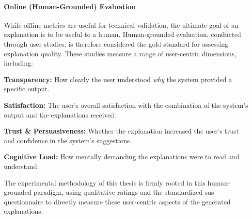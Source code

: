 \paragraph{Online (Human-Grounded) Evaluation}
While offline metrics are useful for technical validation, the ultimate goal of an explanation is to be useful to a human. Human-grounded evaluation, conducted through user studies, is therefore considered the gold standard for assessing explanation quality. These studies measure a range of user-centric dimensions, including:
\begin{compactitem}[\textbullet]
    \item \textbf{Transparency:} How clearly the user understood \textit{why} the system provided a specific output.
    \item \textbf{Satisfaction:} The user's overall satisfaction with the combination of the system's output and the explanations received.
    \item \textbf{Trust \& Persuasiveness:} Whether the explanation increased the user's trust and confidence in the system's suggestions.
    \item \textbf{Cognitive Load:} How mentally demanding the explanations were to read and understand.
\end{compactitem}

The experimental methodology of this thesis is firmly rooted in this human-grounded paradigm, using qualitative ratings and the standardized \ac{sus} questionnaire to directly measure these user-centric aspects of the generated explanations.
